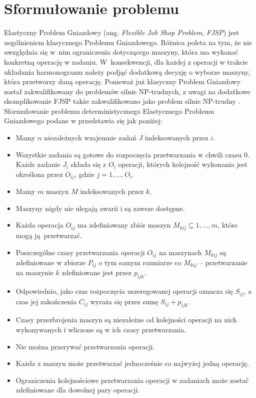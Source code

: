 \documentclass[printmode,oneside]{mgr}
\begin{document}
\chapter{Sformułowanie problemu \label{ch_problem_def}}
Elastyczny Problem Gniazdowy (ang. \emph{Flexible Job Shop Problem}, \emph{FJSP}) jest uogólnieniem klasycznego Problemu Gniazdowego. Różnica poleta na tym, że nie uwzględnia się w~nim ograniczenia dotyczącego maszyny, która ma wykonać konkretną operację w zadaniu. W~konsekwencji, dla każdej z operacji w trakcie układania harmonogramu należy podjąć dodatkową decyzję o wyborze maszyny, która przetworzy daną operację. Ponieważ już klasyczny Problem Gniazdowy został zakwalifikowany do problemów silnie NP-trudnych, z uwagi na dodatkowe skomplikowanie FJSP także zakwalifikowano jako problem silnie NP-trudny \cite{Tay2004}. Sformułowanie problemu deterministycznego Elastycznego Problemu Gniazdowego podane w \cite{AEHGAFJS_ElMekkawy11} przedstawia się jak poniżej:
\begin{itemize}
    \item Mamy $n$ niezależnych wzajemnie zadań $J$ indeksowanych przez $i$.
    \item Wszystkie zadania są gotowe do rozpoczęcia przetwarzania w chwili czasu 0.
    Każde zadanie $J_i$ składa się z $O_i$ operacji, których kolejność wykonania jest określona przez $O_{ij}$, gdzie $j = 1, ..., O_i$.
    \item Mamy $m$ maszyn $M$ indeksowanych przez $k$.
    \item Maszyny nigdy nie ulegają awarii i są zawsze dostępne.
    \item Każda operacja $O_{ij}$ ma zdefiniowany zbiór maszyn $M_{kij} \subseteq {1, ..., m}$, które mogą ją~przetwarzać.
    \item Poszczególne czasy przetwarzania operacji $O_{ij}$ na maszynach $M_{kij}$ są zdefiniowane w zbiorze $P_{ij}$ o tym samym rozmiarze co $M_{kij}$ -- przetwarzanie na maszynie $k$ zdefiniowane jest przez $p_{ijk}$.
    \item Odpowiednio, jako czas rozpoczęcia uszeregowanej operacji oznacza się $S_{ij}$, a czas jej zakończenia $C_{ij}$ wyraża się przez sumę $S_{ij} + p_{ijk}$.
    \item Czasy przezbrojenia maszyn są niezależne od kolejności operacji na nich wykonywanych i wliczone są w ich czasy przetwarzania.
    \item Nie można przerywać przetwarzania operacji.
    \item Każda z maszyn może przetwarzać jednocześnie co najwyżej jedną operację.
    \item Ograniczenia kolejnościowe przetwarzania operacji w zadaniach może zostać zdefiniowane dla dowolnej pary operacji.
\end{itemize}
\end{document}

